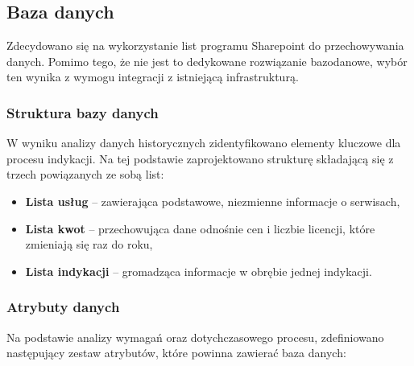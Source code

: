 \subsection{Baza danych}

Zdecydowano się na wykorzystanie list programu Sharepoint do przechowywania danych. Pomimo tego, że nie jest to dedykowane rozwiązanie bazodanowe, wybór ten wynika z wymogu integracji z istniejącą infrastrukturą.

\subsubsection*{Struktura bazy danych}
\label{Subsec: StrukturaBazyDanych}
W wyniku analizy danych historycznych zidentyfikowano elementy kluczowe dla procesu indykacji. Na tej podstawie zaprojektowano strukturę składającą się z trzech powiązanych ze sobą list:

\begin{itemize}
    \item \textbf{Lista usług} -- zawierająca podstawowe, niezmienne informacje o serwisach,
    \item \textbf{Lista kwot} -- przechowująca dane odnośnie cen i liczbie licencji, które zmieniają się raz do roku,
    \item \textbf{Lista indykacji} -- gromadząca informacje w obrębie jednej indykacji.
\end{itemize}
\subsubsection*{Atrybuty danych}
Na podstawie analizy wymagań oraz dotychczasowego procesu, zdefiniowano następujący zestaw atrybutów, które powinna zawierać baza danych:

